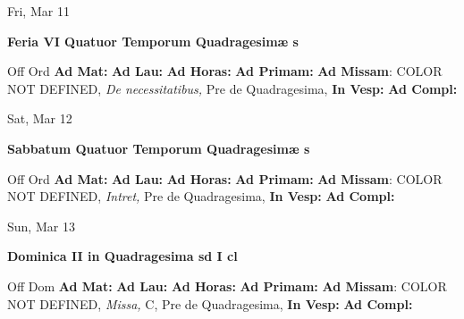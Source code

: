 \documentclass[10pt]{memoir}
\begin{document}
\begin{center}
\begin{minipage}{3.5in}
\vspace{2em}
\begin{center}Fri, Mar 11
\end{center}
\textbf{ \large Feria VI Quatuor Temporum Quadragesimæ
\textnormal{\normalsize s}}

\begin{justify}Off Ord
\textbf{Ad Mat: }
\textbf{Ad Lau: }
\textbf{Ad Horas: }
\textbf{Ad Primam: }\textbf{Ad Missam}: COLOR NOT DEFINED, \textit{De necessitatibus,} Pre de Quadragesima, 
\textbf{In Vesp: }
\textbf{Ad Compl: }
\end{justify}
\end{minipage}
\end{center}

\begin{center}
\begin{minipage}{3.5in}
\vspace{2em}
\begin{center}Sat, Mar 12
\end{center}
\textbf{ \large Sabbatum Quatuor Temporum Quadragesimæ
\textnormal{\normalsize s}}

\begin{justify}Off Ord
\textbf{Ad Mat: }
\textbf{Ad Lau: }
\textbf{Ad Horas: }
\textbf{Ad Primam: }\textbf{Ad Missam}: COLOR NOT DEFINED, \textit{Intret,} Pre de Quadragesima, 
\textbf{In Vesp: }
\textbf{Ad Compl: }
\end{justify}
\end{minipage}
\end{center}

\begin{center}
\begin{minipage}{3.5in}
\vspace{2em}
\begin{center}Sun, Mar 13
\end{center}
\textbf{ \large Dominica II in Quadragesima
\textnormal{\normalsize sd I cl}}

\begin{justify}Off Dom
\textbf{Ad Mat: }
\textbf{Ad Lau: }
\textbf{Ad Horas: }
\textbf{Ad Primam: }\textbf{Ad Missam}: COLOR NOT DEFINED, \textit{Missa,} C, Pre de Quadragesima, 
\textbf{In Vesp: }
\textbf{Ad Compl: }
\end{justify}
\end{minipage}
\end{center}
\end{document}
